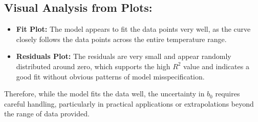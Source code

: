 \documentclass{article}
\begin{document}
\subsection*{Visual Analysis from Plots:}
\begin{itemize}
    \item \textbf{Fit Plot:} The model appears to fit the data points very well, as the curve closely follows the data points across the entire temperature range.
    \item \textbf{Residuals Plot:} The residuals are very small and appear randomly distributed around zero, which supports the high \(R^2\) value and indicates a good fit without obvious patterns of model misspecification.
\end{itemize}

Therefore, while the model fits the data well, the uncertainty in \(b_0\) requires careful handling, particularly in practical applications or extrapolations beyond the range of data provided.
\end{document}
